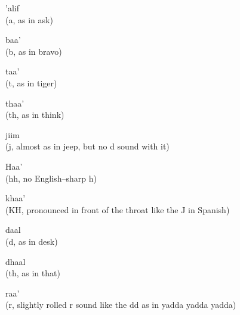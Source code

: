 

\begin{flashcard}{\LARGE ’alif \\ (a, as in ask)}
\LARGE {}
\end{flashcard}
\begin{flashcard}{\LARGE baa' \\ (b, as in bravo)}
\LARGE {}
\end{flashcard}
\begin{flashcard}{\LARGE taa' \\ (t, as in tiger)}
\LARGE {}
\end{flashcard}
\begin{flashcard}{\LARGE thaa' \\ (th, as in think)}
\LARGE {}
\end{flashcard}
\begin{flashcard}{\LARGE jiim \\ (j, almost as in jeep, but no d sound with it)}
\LARGE {}
\end{flashcard}
\begin{flashcard}{\LARGE Haa' \\ (hh, no English--sharp h)}
\LARGE {}
\end{flashcard}
\begin{flashcard}{\LARGE khaa' \\ (KH, pronounced in front of the throat like the J in Spanish)}
\LARGE {}
\end{flashcard}
\begin{flashcard}{\LARGE daal \\ (d, as in desk)}
\LARGE {}
\end{flashcard}
\begin{flashcard}{\LARGE dhaal \\ (th, as in that)}
\LARGE {}
\end{flashcard}
\begin{flashcard}{\LARGE raa' \\ (r, slightly rolled r sound like the dd as in yadda yadda yadda)}
\LARGE {}
\end{flashcard}
